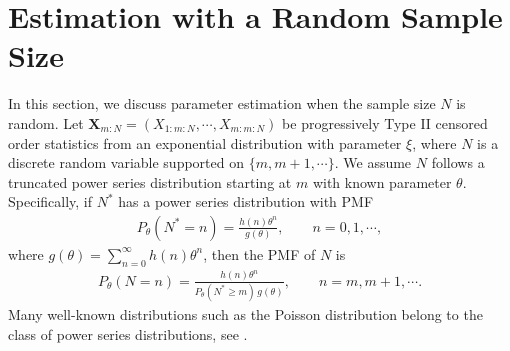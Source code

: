 \documentclass[twoside]{article}
\begin{document}
\section{Estimation with a Random Sample Size }	
In this section, we discuss parameter estimation when the sample size $N$ is random. Let ${\boldsymbol X}_{m:N}=(X_{1:m:N},\cdots,X_{m:m:N})$ be progressively Type II censored order statistics from an exponential distribution with parameter $\xi$, where $N$ is a discrete random variable supported on $\{m,m+1,\cdots\}$. We assume $N$ follows a truncated power series distribution starting at $m$ with known parameter $\theta$. Specifically, if $N^*$ has a power series distribution with PMF
\begin{align*}
P_\theta(N^*=n)=\frac{h(n)\theta^n}{g(\theta)}, \qquad n=0,1,\cdots,
\end{align*}
where $g(\theta)=\sum_{n=0}^\infty h(n)\theta^n$, then the PMF of $N$ is
\begin{align}\label{pmf}
P_\theta(N=n)=\frac{h(n)\theta^n}{P_\theta(N^*\geq m)\,g(\theta)}, \qquad n=m,m+1,\cdots.
\end{align}
Many well-known distributions such as the Poisson distribution belong to the class of power series distributions, see \cite{Mahmoudi:Mahmoodian:2015}.
\end{document}
